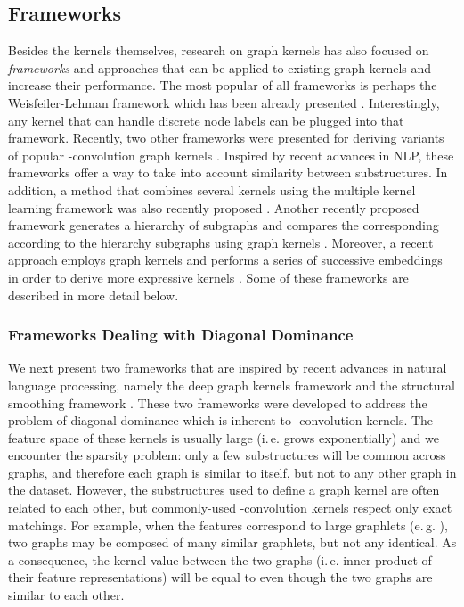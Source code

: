 \documentclass[twoside,11pt]{article}
\newcommand{\eg}{e.\,g. }
\newcommand{\ie}{i.\,e. }
\begin{document}
\subsection{Frameworks}
Besides the kernels themselves, research on graph kernels has also focused on \textit{frameworks} and approaches that can be applied to existing graph kernels and increase their performance.
The most popular of all frameworks is perhaps the Weisfeiler-Lehman framework which has been already presented \cite{shervashidze2011weisfeiler}.
Interestingly, any kernel that can handle discrete node labels can be plugged into that framework.
Recently, two other frameworks were presented for deriving variants of popular -convolution graph kernels \cite{yanardag2015deep,yanardag2015structural}.
Inspired by recent advances in NLP, these frameworks offer a way to take into account similarity between substructures.
In addition, a method that combines several kernels using the multiple kernel learning framework was also recently proposed \cite{aiolli2015multiple}.
Another recently proposed framework generates a hierarchy of subgraphs and compares the corresponding according to the hierarchy subgraphs using graph kernels \cite{nikolentzos2018}.
Moreover, a recent approach employs graph kernels and performs a series of successive embeddings in order to derive more expressive kernels \cite{nikolentzos2018enhancing}.
Some of these frameworks are described in more detail below.

\subsubsection{Frameworks Dealing with Diagonal Dominance}
We next present two frameworks that are inspired by recent advances in natural language processing, namely the deep graph kernels framework \cite{yanardag2015deep} and the structural smoothing framework \cite{yanardag2015structural}. 
These two frameworks were developed to address the problem of diagonal dominance which is inherent to -convolution kernels.
The feature space of these kernels is usually large (\ie grows exponentially) and we encounter the sparsity problem: only a few substructures will be common across graphs, and therefore each graph is similar to itself, but not to any other graph in the dataset.
However, the substructures used to define a graph kernel are often related to each other, but commonly-used -convolution kernels respect only exact matchings. 
For example, when the features correspond to large graphlets (\eg ), two graphs may be composed of many similar graphlets, but not any identical.
As a consequence, the kernel value between the two graphs (\ie inner product of their feature representations) will be equal to  even though the two graphs are similar to each other.
\end{document}
